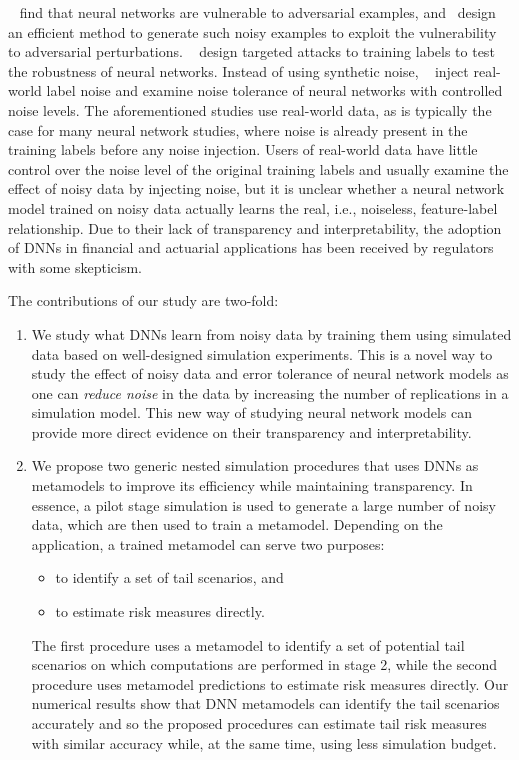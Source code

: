 ~\cite{szegedy2013intriguing} find that neural networks are vulnerable to adversarial examples, and~\cite{goodfellow2014explaining} design an efficient method to generate such noisy examples to exploit the vulnerability to adversarial perturbations.
~\cite{carlini2017towards} design targeted attacks to training labels to test the robustness of neural networks. 
Instead of using synthetic noise, ~\cite{jiang2020beyond} inject real-world label noise and examine noise tolerance of neural networks with controlled noise levels.
The aforementioned studies use real-world data, as is typically the case for many neural network studies, where noise is already present in the training labels before any noise injection.
Users of real-world data have little control over the noise level of the original training labels and usually examine the effect of noisy data by injecting noise, but it is unclear whether a neural network model trained on noisy data actually learns the real, i.e., noiseless, feature-label relationship.
Due to their lack of transparency and interpretability, the adoption of DNNs in financial and actuarial applications has been received by regulators with some skepticism.

The contributions of our study are two-fold:
\begin{enumerate}
    \item We study what DNNs learn from noisy data by training them using simulated data based on well-designed simulation experiments.
    This is a novel way to study the effect of noisy data and error tolerance of neural network models as one can \textit{reduce noise} in the data by increasing the number of replications in a simulation model.
    This new way of studying neural network models can provide more direct evidence on their transparency and interpretability. 
    \item We propose two generic nested simulation procedures that uses DNNs as metamodels to improve its efficiency while maintaining transparency. 
    In essence, a pilot stage simulation is used to generate a large number of noisy data, which are then used to train a metamodel.
    Depending on the application, a trained metamodel can serve two purposes: 
    \begin{itemize}
        \item to identify a set of tail scenarios, and 
        \item to estimate risk measures directly.
    \end{itemize}
    The first procedure uses a metamodel to identify a set of potential tail scenarios on which computations are performed in stage 2, while the second procedure uses metamodel predictions to estimate risk measures directly.
    Our numerical results show that DNN metamodels can identify the tail scenarios accurately and so the proposed procedures can estimate tail risk measures with similar accuracy while, at the same time, using less simulation budget.
\end{enumerate}

